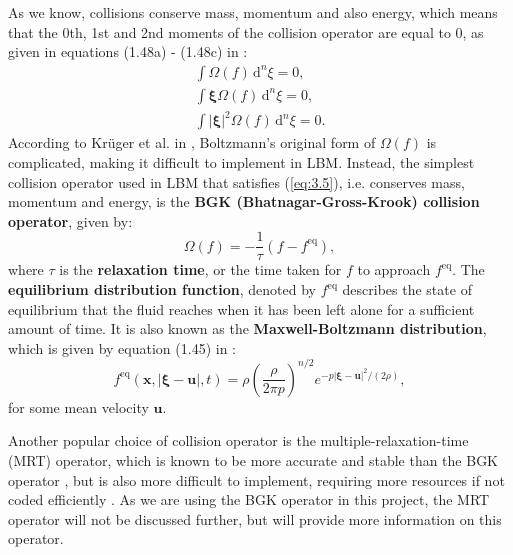 \documentclass[a4paper, 11pt]{report}
\begin{document}
As we know, collisions conserve mass, momentum and also energy, which means that the 0th, 1st and 2nd moments of the collision operator are equal to 0, as given in equations (1.48a) - (1.48c) in \cite{lbtextbook}:
\begin{subequations} \label{eq:3.5}
\begin{align}
    \int \! \Omega(f) \, \mathrm{d}^n\xi = 0, \label{eq:3.5a} \\
    \int \! \bm{\xi} \Omega(f) \, \mathrm{d}^n\xi = 0, \label{eq:3.5b} \\
    \int \! |\bm{\xi}|^2 \Omega(f) \, \mathrm{d}^n\xi = 0. \label{eq:3.5c}
\end{align}
\end{subequations}
According to Kr{\"u}ger et al. in \cite[Section 1.3.4]{lbtextbook}, Boltzmann's original form of $\Omega(f)$ is complicated, making it difficult to implement in LBM. Instead, the simplest collision operator used in LBM that satisfies (\ref{eq:3.5}), i.e. conserves mass, momentum and energy, is the \textbf{BGK (Bhatnagar-Gross-Krook) collision operator}, given by:
\begin{equation}
    \Omega(f) = -\frac{1}{\tau}(f - f^{\mathrm{eq}}), \label{eq:3.6}
\end{equation}
where $\tau$ is the \textbf{relaxation time}, or the time taken for $f$ to approach $f^{\mathrm{eq}}$. The \textbf{equilibrium distribution function}, denoted by $f^{\mathrm{eq}}$ describes the state of equilibrium that the fluid reaches when it has been left alone for a sufficient amount of time. It is also known as the \textbf{Maxwell-Boltzmann distribution}, which is given by equation (1.45) in \cite{lbtextbook}:
\begin{equation}
    f^{\mathrm{eq}}(\mathbf{x}, |\bm{\xi}-\mathbf{u}|,t) = \rho\left(\frac{\rho}{2\pi p}\right)^{n/2}e^{-p|\bm{\xi}-\mathbf{u}|^2/(2\rho)}, \label{eq:3.7}
\end{equation}
for some mean velocity $\mathbf{u}$.

Another popular choice of collision operator is the multiple-relaxation-time (MRT) operator, which is known to be more accurate and stable than the BGK operator \cite{mrt}, but is also more difficult to implement, requiring more resources if not coded efficiently \cite[Section 10.7.3]{lbtextbook}. As we are using the BGK operator in this project, the MRT operator will not be discussed further, but \cite{mrt} will provide more information on this operator.
\end{document}
